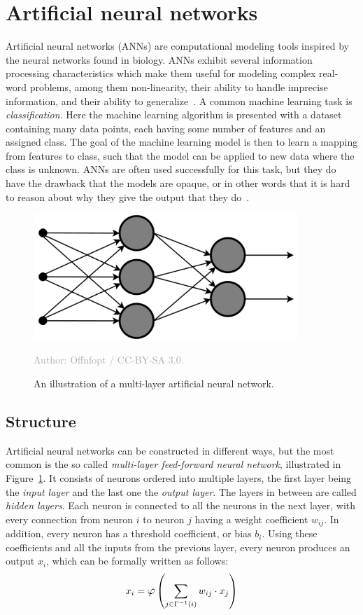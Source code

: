 \documentclass{kththesis}
\newcommand{\source}[1]{\vspace{-5mm}\caption*{\textcolor{darkgray}{Author: {#1}}\vspace{-7mm}} }
\begin{document}
\section{Artificial neural networks}
Artificial neural networks (ANNs) are computational modeling tools inspired by the neural networks found in biology. ANNs exhibit several information processing characteristics which make them useful for modeling complex real-word problems, among them non-linearity, their ability to handle imprecise information, and their ability to generalize~\cite{ANNFundamentals}. A common machine learning task is \textit{classification}. Here the machine learning algorithm is presented with a dataset containing many data points, each having some number of features and an assigned class. The goal of the machine learning model is then to learn a mapping from features to class, such that the model can be applied to new data where the class is unknown. ANNs are often used successfully for this task, but they do have the drawback that the models are opaque, or in other words that it is hard to reason about why they give the output that they do~\cite[p. 3, 8--9]{weiss1990empirical}.

\begin{figure}
  \begin{center}
    \includegraphics[width=100mm]{img/neural_network.png}
    \caption{An illustration of a multi-layer artificial neural network. }
    \source{Offnfopt / CC-BY-SA 3.0.}
    \label{fig:mlf}
  \end{center}
\end{figure}

\subsection{Structure}
Artificial neural networks can be constructed in different ways, but the most common is the so called \textit{multi-layer feed-forward neural network}, illustrated in Figure~\ref{fig:mlf}. It consists of neurons ordered into multiple layers, the first layer being the \textit{input layer} and the last one the \textit{output layer}. The layers in between are called \textit{hidden layers}. Each neuron is connected to all the neurons in the next layer, with every connection from neuron $i$ to neuron $j$ having a weight coefficient $w_{ij}$. In addition, every neuron has a threshold coefficient, or bias $b_i$. Using these coefficients and all the inputs from the previous layer, every neuron produces an output $x_i$, which can be formally written as follows:
\[x_i = \mathlarger{\varphi}\left(\sum_{j \in \Gamma^{-1}(i)}{w_{ij} \cdot x_j}\right)\]
\end{document}
